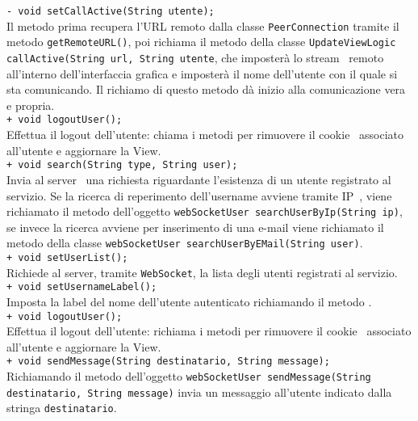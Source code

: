 {{\begin{sloppypar}
{{{\begin{itemize}
{					\texttt{- void setCallActive(String utente);}\\
					Il metodo prima recupera l'URL remoto dalla classe \texttt{PeerConnection} tramite il metodo \texttt{getRemoteURL()}, poi richiama il metodo della classe \texttt{UpdateViewLogic callActive(String url, String utente}, che imposterà lo stream\g~ remoto all'interno dell'interfaccia grafica e imposterà il nome dell'utente con il quale si sta comunicando. Il richiamo di questo metodo dà inizio alla comunicazione vera e propria.\\
					
					\texttt{+ void logoutUser();}\\
					Effettua il logout dell'utente: chiama i metodi per rimuovere il cookie\g~ associato all'utente e aggiornare la View.\\
					
					\texttt{+ void search(String type, String user);}\\
					Invia al server\g~ una richiesta riguardante l'esistenza di un utente registrato al servizio. Se la ricerca di reperimento dell'username avviene tramite IP\g~, viene richiamato il metodo dell'oggetto \texttt{webSocketUser searchUserByIp(String ip)}, se invece la ricerca avviene per inserimento di una e-mail viene richiamato il metodo della classe \texttt{webSocketUser searchUserByEMail(String user)}.\\
					
					\texttt{+ void setUserList();}\\
					Richiede al server\g, tramite \texttt{WebSocket}, la lista degli utenti registrati al servizio.\\
					
					\texttt{+ void setUsernameLabel();}\\
					Imposta la label del nome dell'utente autenticato richiamando il metodo .\\
					
					\texttt{+ void logoutUser();}\\
					Effettua il logout dell'utente: richiama i metodi per rimuovere il cookie\g~ associato all'utente e aggiornare la View.\\
					
					\texttt{+ void sendMessage(String destinatario, String message);}\\
					Richiamando il metodo dell'oggetto \texttt{webSocketUser sendMessage(String destinatario, String message)} invia un messaggio all'utente indicato dalla stringa \texttt{destinatario}.\\
					 
}
\end{itemize}}}}
\end{sloppypar}}}

